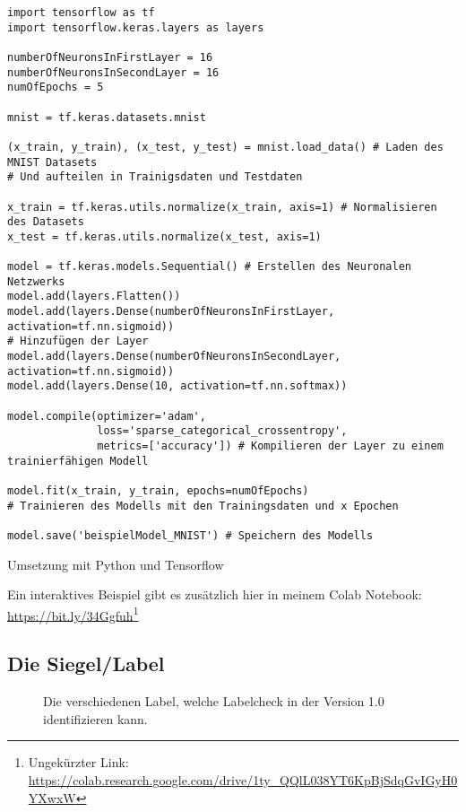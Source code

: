 \begin{listing}[H]
    \begin{verbatim}
import tensorflow as tf
import tensorflow.keras.layers as layers

numberOfNeuronsInFirstLayer = 16 
numberOfNeuronsInSecondLayer = 16 
numOfEpochs = 5 

mnist = tf.keras.datasets.mnist

(x_train, y_train), (x_test, y_test) = mnist.load_data() # Laden des MNIST Datasets
# Und aufteilen in Trainigsdaten und Testdaten

x_train = tf.keras.utils.normalize(x_train, axis=1) # Normalisieren des Datasets
x_test = tf.keras.utils.normalize(x_test, axis=1)

model = tf.keras.models.Sequential() # Erstellen des Neuronalen Netzwerks
model.add(layers.Flatten())
model.add(layers.Dense(numberOfNeuronsInFirstLayer, activation=tf.nn.sigmoid))
# Hinzufügen der Layer
model.add(layers.Dense(numberOfNeuronsInSecondLayer, activation=tf.nn.sigmoid))
model.add(layers.Dense(10, activation=tf.nn.softmax))

model.compile(optimizer='adam',
              loss='sparse_categorical_crossentropy',
              metrics=['accuracy']) # Kompilieren der Layer zu einem trainierfähigen Modell

model.fit(x_train, y_train, epochs=numOfEpochs)
# Trainieren des Modells mit den Trainingsdaten und x Epochen

model.save('beispielModel_MNIST') # Speichern des Modells

    \end{verbatim}
    \caption{Umsetzung mit Python und Tensorflow}
\end{listing}
Ein interaktives Beispiel gibt es zusätzlich hier in meinem Colab Notebook: \url{https://bit.ly/34Ggfuh}\footnote{Ungekürzter Link: \url{https://colab.research.google.com/drive/1ty_QQlL038YT6KpBjSdqGvIGyH0YXwxW}}

\subsection{Die Siegel/Label}\label{angang:label}

\begin{figure}[H]
    \centering
    \qquad
    \qquad
    \qquad
    \qquad
    \qquad
    \qquad
    \caption[Label]{Die verschiedenen Label, welche Labelcheck in der Version 1.0 identifizieren kann.}
    \label{labels}%
\end{figure}


